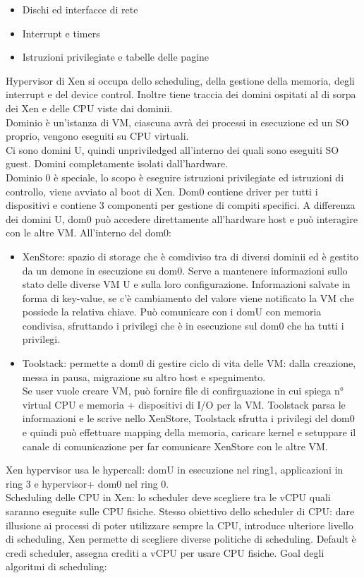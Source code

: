 \documentclass{article}
\begin{document}
\begin{itemize}
\item Dischi ed interfacce di rete
\item Interrupt e timers
\item Istruzioni privilegiate e tabelle delle pagine
\end{itemize}
Hypervisor di Xen si occupa dello scheduling, della gestione della memoria, degli interrupt e del device control. Inoltre tiene traccia dei domini ospitati al di sorpa dei Xen e delle CPU viste dai dominii.\\ Dominio è un'istanza di VM, ciascuna avrà dei processi in esecuzione ed un SO proprio, vengono eseguiti su CPU virtuali.\\ Ci sono domini U, quindi unpriviledged all'interno dei quali sono eseguiti SO guest. Domini completamente isolati dall'hardware.\\ Dominio 0 è speciale, lo scopo è eseguire istruzioni privilegiate ed istruzioni di controllo, viene avviato al boot di Xen. Dom0 contiene driver per tutti i dispositivi e contiene 3 componenti per gestione di compiti specifici. A differenza dei domini U, dom0 può accedere direttamente all'hardware host e può interagire con le altre VM. All'interno del dom0:
\begin{itemize}
\item XenStore: spazio di storage che è comdiviso tra di diversi dominii ed è gestito da un demone in esecuzione su dom0. Serve a mantenere  informazioni sullo stato delle diverse VM U e sulla loro configurazione. Informazioni salvate in forma di key-value, se c'è cambiamento del valore viene notificato la VM che possiede la relativa chiave. Può comunicare con i domU con memoria condivisa, sfruttando i privilegi che è in esecuzione sul dom0 che ha tutti i privilegi.
\item Toolstack: permette a dom0 di gestire ciclo di vita delle VM: dalla creazione, messa in pausa, migrazione su altro host e spegnimento.\\ Se user vuole creare VM, può fornire file di confirguazione in cui spiega n° virtual CPU e memoria + dispositivi di I/O per la VM. Toolstack parsa le informazioni e le scrive nello XenStore, Toolstack sfrutta i privilegi del dom0 e quindi può effettuare mapping della memoria, caricare kernel e setuppare il canale di comunicazione per far comunicare XenStore con le altre VM.
\end{itemize}
Xen hypervisor usa le hypercall: domU in esecuzione nel ring1, applicazioni in ring 3 e hypervisor+ dom0 nel ring 0.\\ Scheduling delle CPU in Xen: lo scheduler deve scegliere tra le vCPU quali saranno eseguite sulle CPU fisiche. Stesso obiettivo dello scheduler di CPU: dare illusione ai processi di poter utilizzare sempre la CPU, introduce ulteriore livello di scheduling, Xen permette di scegliere diverse politiche di scheduling. Default è credi scheduler, assegna crediti a vCPU per usare CPU fisiche. Goal degli algoritmi di scheduling: 
\end{document}
